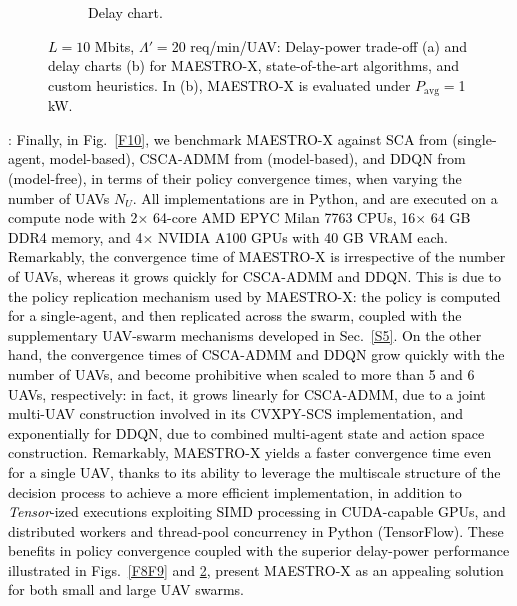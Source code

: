 \documentclass[12pt, draftcls, onecolumn]{IEEEtran}
\theoremstyle{plain}
\theoremstyle{definition}
\theoremstyle{remark}
\newcommand\hlt[1]{\textcolor{black}{#1}}
\begin{document}
\begin{figure} [t]
\begin{subfigure}{0.448\linewidth}
         \caption{\hlt{Delay chart.}}
         \label{F9a}
     \end{subfigure}
     \vspace{-6mm}
     \caption{\hlt{$L{=}10$ Mbits, $\Lambda'{=}$20 req/min/UAV: Delay-power trade-off (a) and delay charts (b) for MAESTRO-X, state-of-the-art algorithms, and custom heuristics. In (b), MAESTRO-X is evaluated under $P_{\mathrm{avg}}=$1 kW.}}
     \label{F8aF9a}
\end{figure}

\noindent{\hlt{\underline{Policy convergence time}}}: \hlt{Finally, in Fig.~\ref{F10}, we benchmark MAESTRO-X against SCA from \cite{SCA} (single-agent, model-based), CSCA-ADMM from \cite{CSCA-ADMM} (model-based), and DDQN from \cite{DDQN} (model-free), in terms of their policy convergence times, when varying the number of UAVs $N_{U}$. All implementations are in Python, and are executed on a compute node with 2$\times$ 64-core AMD EPYC Milan 7763 CPUs, 16$\times$ 64 GB DDR4 memory, and 4$\times$ NVIDIA A100 GPUs with 40 GB VRAM each. Remarkably, the convergence time of MAESTRO-X is irrespective of the number of UAVs, whereas it grows quickly for CSCA-ADMM and DDQN. This is due to the policy replication mechanism used by MAESTRO-X: the policy is computed for a single-agent, and then replicated across the swarm, coupled with the supplementary UAV-swarm mechanisms developed in Sec.~\ref{S5}. On the other hand, the convergence times of CSCA-ADMM and DDQN grow quickly with the number of UAVs, and become prohibitive when scaled to more than 5 and 6 UAVs, respectively: in fact, it grows linearly for CSCA-ADMM, due to a joint multi-UAV construction involved in its CVXPY-SCS implementation, and exponentially for DDQN, due to combined multi-agent state and action space construction. Remarkably, MAESTRO-X yields a faster convergence time even for a single UAV, thanks to its ability to leverage the multiscale structure of the decision process to achieve a more efficient implementation, in addition to \emph{Tensor}-ized executions exploiting SIMD processing in CUDA-capable GPUs, and distributed workers and thread-pool concurrency in Python (TensorFlow). These benefits in policy convergence coupled with the superior delay-power performance illustrated in Figs.~\ref{F8F9} and \ref{F8aF9a}, present MAESTRO-X as an appealing solution for both small and large UAV swarms.}
\end{document}

